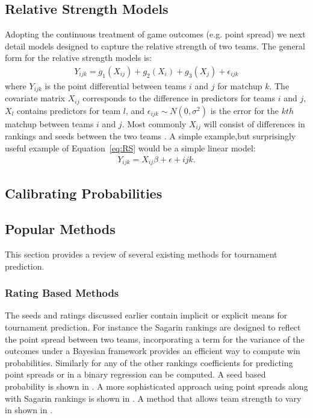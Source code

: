 \subsection{Relative Strength Models}
Adopting the continuous treatment of game outcomes (e.g. point spread) we next detail models designed to capture the relative strength of two teams. The general form for the relative strength models is:
\begin{eqnarray}
Y_{ijk} = g_1(X_{ij}) + g_2(X_i) + g_3(X_j) +  \epsilon_{ijk}
\label{eq:RS}
\end{eqnarray}
where $Y_{ijk}$ is the point differential between teams $i$ and $j$ for matchup $k$.  The covariate matrix $X_{ij}$ corresponds to the difference in predictors for teams $i$ and $j$, $X_l$ contains predictors for team $l$, and $\epsilon_{ijk} \sim N(0,\sigma^2)$ is the error for the $kth$ matchup between teams $i$ and $j$.  Most commonly $X_{ij}$ will consist of differences in rankings and seeds between the two teams . A simple example,but surprisingly useful example of Equation~\ref{eq:RS} would be a simple linear model:
\begin{eqnarray}
Y_{ijk} = X_{ij}\beta + \epsilon+{ijk}.
\label{eq:RS_Linear}
\end{eqnarray}
\subsection{Calibrating Probabilities}
\subsection{Popular Methods}  This section provides a review of several existing methods for tournament prediction.
\subsubsection{Rating Based Methods} 
The seeds and ratings discussed earlier contain implicit or explicit means for tournament prediction. For instance the Sagarin rankings are designed to reflect the point spread between two teams, incorporating a term for the variance of the outcomes under a Bayesian framework provides an efficient way to compute win probabilities. Similarly for any of the other rankings coefficients for predicting point spreads or in a binary regression can be computed. A seed based probability is shown in \cite{schwertman1996}. A more sophisticated approach using point spreads along with Sagarin rankings is shown in \cite{carlin1996}. A method that allows team strength to vary in shown in \cite{glickman1998}.
